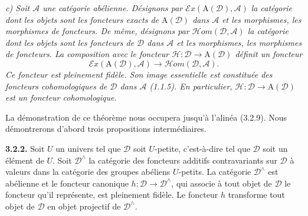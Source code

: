 \textit{c) Soit $\mathcal A$ une catégorie abélienne. Désignons par
$\mathcal E x(\mathrm A(\mathcal D),\mathcal A)$ la catégorie dont les objets
sont les foncteurs exacts de $\mathrm A(\mathcal D)$ dans $\mathcal A$ et les
morphismes, les morphismes de foncteurs. De même, désignons par
$\mathcal H\!om(\mathcal D,\mathcal A)$ la catégorie dont les objets sont les
foncteurs de $\mathcal D$ dans $\mathcal A$ et les morphismes, les morphismes
de foncteurs. La composition avec le foncteur
$\mathcal H\colon\mathcal D\to\mathrm A(\mathcal D)$ définit un foncteur}
\[
\mathcal E x(\mathrm A(\mathcal D),\mathcal A)
\longrightarrow
\mathcal H\!om(\mathcal D,\mathcal A).
\]
\textit{Ce foncteur est pleinement fidèle. Son image essentielle est constituée
des foncteurs cohomologiques de $\mathcal D$ dans $\mathcal A$ (1.1.5). En
particulier, $\mathcal H\colon\mathcal D\to\mathrm A(\mathcal D)$ est un
foncteur cohomologique.}

La démonstration de ce théorème nous occupera jusqu'à l'alinéa (3.2.9). Nous
démontrerons d'abord trois propositions intermédiaires.

\medskip
\noindent\textbf{3.2.2.}\quad
Soit $U$ un univers tel que $\mathcal D$ soit $U$-petite, c'est-à-dire tel que
$\mathcal D$ soit un élément de $U$. Soit
$\mathcal D^\wedge$ la catégorie des foncteurs additifs contravariants sur
$\mathcal D$ à valeurs dans la catégorie des groupes abéliens $U$-petits. La catégorie
$\mathcal D^\wedge$ est abélienne et le foncteur canonique
$h\colon\mathcal D\to\mathcal D^\wedge$, qui associe à tout objet de
$\mathcal D$ le foncteur
qu'il représente, est pleinement fidèle. Le foncteur $h$ transforme tout
objet de $\mathcal D$ en objet projectif de $\mathcal D^\wedge$.
\endgroup
